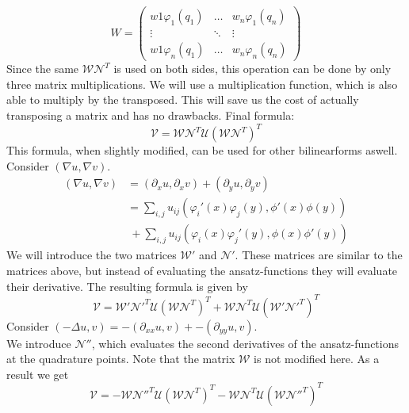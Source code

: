 \documentclass[a4paper,12pt]{report}
\begin{document}
\[W=
\begin{pmatrix}
w1 \varphi_1(q_1) & \hdots & w_n \varphi_1(q_n) \\
\vdots & \ddots & \vdots \\
w1 \varphi_n(q_1) & \hdots & w_n \varphi_n(q_n)
\end{pmatrix}
\]
Since the same $\mathcal{W} \mathcal{N}^T$ is used on both sides, this operation can be done by only three matrix multiplications. We will use a multiplication function, which is also able to multiply by the transposed. This will save us the cost of actually transposing a matrix and has no drawbacks. Final formula:
\begin{equation}
\mathcal{V} = \mathcal{W} \mathcal{N}^T \mathcal{U} (\mathcal{W} \mathcal{N}^T)^T
\end{equation}
This formula, when slightly modified, can be used for other bilinearforms aswell. Consider 
$(\nabla u, \nabla v)$.
\begin{align}
(\nabla u, \nabla v) &=(\partial_x u,\partial_x v) + (\partial_y u,\partial_y v) \\
					   &=\sum_{i,j} u_{ij} (\varphi_i'(x)\varphi_j(y),\phi'(x)\phi(y)) \\
					   & \ + \sum_{i,j} u_{ij} (\varphi_i(x)\varphi_j'(y),\phi(x)\phi'(y))
\end{align}
We will introduce the two matrices $\mathcal{W}'$ and $\mathcal{N}'$. These matrices are similar to the matrices above, but instead of evaluating the ansatz-functions they will evaluate their derivative. The resulting formula is given by
\[\mathcal{V}=\mathcal{W}' \mathcal{N}'^T \mathcal{U} (\mathcal{W} \mathcal{N}^T)^T +\mathcal{W} \mathcal{N}^T \mathcal{U} (\mathcal{W}' \mathcal{N}'^T)^T\]
Consider $(-\Delta u, v)=-(\partial_{xx} u,v) + -(\partial_{yy} u,v)$.\\
We introduce $\mathcal{N}''$, which evaluates the second derivatives of the ansatz-functions at the quadrature points. Note that the matrix $\mathcal{W}$ is not modified here. As a result we get 
\[\mathcal{V}=-\mathcal{W} \mathcal{N}''^T \mathcal{U} (\mathcal{W} \mathcal{N}^T)^T -\mathcal{W} \mathcal{N}^T \mathcal{U} (\mathcal{W} \mathcal{N}''^T)^T\]
\end{document}

